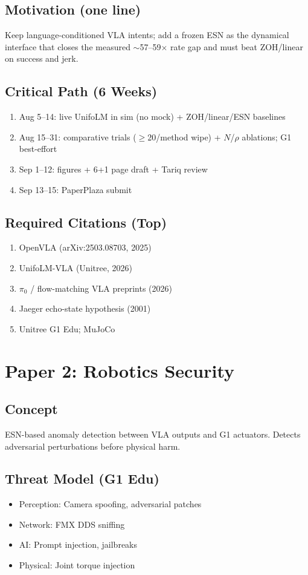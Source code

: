 \documentclass[conference]{IEEEtran}
\begin{document}
\subsection{Motivation (one line)}
Keep language-conditioned VLA intents; add a frozen ESN as the dynamical interface that closes the measured $\sim$57--59$\times$ rate gap and must beat ZOH/linear on success and jerk.

\subsection{Critical Path (6 Weeks)}
\begin{enumerate}
    \item Aug 5--14: live UnifoLM in sim (no mock) + ZOH/linear/ESN baselines
    \item Aug 15--31: comparative trials ($\geq$20/method wipe) + $N$/$\rho$ ablations; G1 best-effort
    \item Sep 1--12: figures + 6+1 page draft + Tariq review
    \item Sep 13--15: PaperPlaza submit
\end{enumerate}

\subsection{Required Citations (Top)}
\begin{enumerate}
    \item OpenVLA (arXiv:2503.08703, 2025)
    \item UnifoLM-VLA (Unitree, 2026)
    \item $\pi_0$ / flow-matching VLA preprints (2026)
    \item Jaeger echo-state hypothesis (2001)
    \item Unitree G1 Edu; MuJoCo
\end{enumerate}

\section{Paper 2: Robotics Security}

\subsection{Concept}
ESN-based anomaly detection between VLA outputs and G1 actuators. Detects adversarial perturbations before physical harm.

\subsection{Threat Model (G1 Edu)}
\begin{itemize}
    \item Perception: Camera spoofing, adversarial patches
    \item Network: FMX DDS sniffing
    \item AI: Prompt injection, jailbreaks
    \item Physical: Joint torque injection
\end{itemize}
\end{document}
